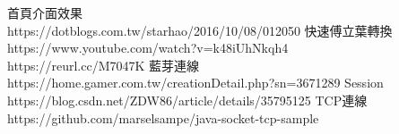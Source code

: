 \documentclass[12pt]{article}  %
\theoremstyle{plain}
\begin{document}

\begin{thebibliography}{99}  %
首頁介面效果\\
https://dotblogs.com.tw/starhao/2016/10/08/012050
快速傅立葉轉換\\
https://www.youtube.com/watch?v=k48iUhNkqh4 \\
https://reurl.cc/M7047K
藍芽連線\\
https://home.gamer.com.tw/creationDetail.php?sn=3671289
Session\\
https://blog.csdn.net/ZDW86/article/details/35795125
TCP連線\\
https://github.com/marselsampe/java-socket-tcp-sample
\end{thebibliography}
\newpage
\end{document}
